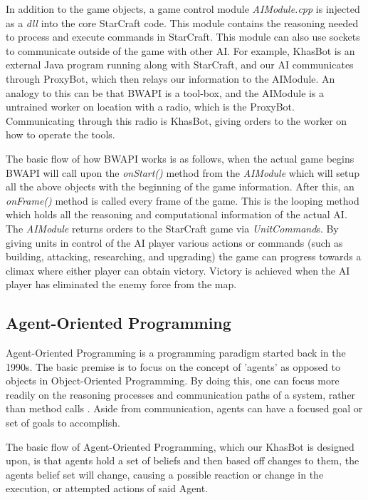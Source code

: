 \documentclass[letterpaper]{article}
\begin{document}
In addition to the game objects, a game control module \emph{AIModule.cpp} is injected as a \emph{dll} into the core StarCraft code.  This module contains the reasoning needed to process and execute commands in StarCraft.  This module can also use sockets to communicate outside of the game with other AI. For example, KhasBot is an external Java program running along with StarCraft, and our AI communicates through ProxyBot, which then relays our information to the AIModule.  An analogy to this can be that BWAPI is a tool-box, and the AIModule is a untrained worker on location with a radio, which is the ProxyBot.  Communicating through this radio is KhasBot, giving orders to the worker on how to operate the tools.

The basic flow of how BWAPI works is as follows, when the actual game begins BWAPI will call upon the \emph{onStart()} method from the \emph{AIModule} which will setup all the above objects with the beginning of the game information.  After this, an \emph{onFrame()} method is called every frame of the game.  This is the looping method which holds all the reasoning and computational information of the actual AI.  The \emph{AIModule} returns orders to the StarCraft game via \emph{UnitCommand}s.  By giving units in control of the AI player various actions or commands (such as building, attacking, researching, and upgrading) the game can progress towards a climax where either player can obtain victory. Victory is achieved when the AI player has eliminated the enemy force from the map.



\subsection{Agent-Oriented Programming}
Agent-Oriented Programming is a programming paradigm started back in the 1990s.  The basic premise is to focus on the concept of 'agents' as opposed to objects in Object-Oriented Programming.  By doing this, one can focus more readily on the reasoning processes and communication paths of a system, rather than method calls \cite{AOP}.  Aside from communication, agents can have a focused goal or set of goals to accomplish.

The basic flow of Agent-Oriented Programming, which our KhasBot is designed upon, is that agents hold a set of beliefs and then based off changes to them, the agents belief set will change, causing a possible reaction or change in the execution, or attempted actions of said Agent.
\end{document}
